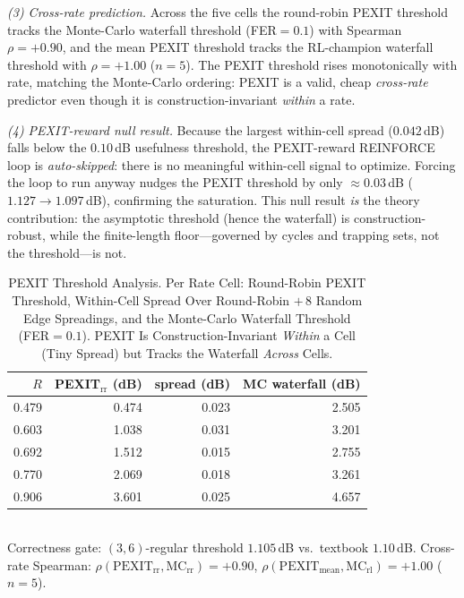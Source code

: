 \documentclass[journal]{IEEEtran}
\begin{document}
\emph{(3) Cross-rate prediction.} Across the five cells the round-robin PEXIT
threshold tracks the Monte-Carlo waterfall threshold (FER$=0.1$) with Spearman
$\rho=+0.90$, and the mean PEXIT threshold tracks the RL-champion waterfall
threshold with $\rho=+1.00$ ($n{=}5$). The PEXIT threshold rises monotonically
with rate, matching the Monte-Carlo ordering: PEXIT is a valid, cheap
\emph{cross-rate} predictor even though it is construction-invariant
\emph{within} a rate.

\emph{(4) PEXIT-reward null result.} Because the largest within-cell spread
($0.042$\,dB) falls below the $0.10$\,dB usefulness threshold, the PEXIT-reward
REINFORCE loop is \emph{auto-skipped}: there is no meaningful within-cell signal
to optimize. Forcing the loop to run anyway nudges the PEXIT threshold by only
$\approx\!0.03$\,dB ($1.127\!\to\!1.097$\,dB), confirming the saturation. This
null result \emph{is} the theory contribution: the asymptotic threshold (hence
the waterfall) is construction-robust, while the finite-length floor---governed
by cycles and trapping sets, not the threshold---is not.

\begin{table}[t]
\centering
\caption{PEXIT Threshold Analysis. Per Rate Cell: Round-Robin PEXIT Threshold,
Within-Cell Spread Over Round-Robin $+\,8$ Random Edge Spreadings, and the
Monte-Carlo Waterfall Threshold (FER$=0.1$). PEXIT Is Construction-Invariant
\emph{Within} a Cell (Tiny Spread) but Tracks the Waterfall \emph{Across} Cells.}
\label{tab:pexit}
\renewcommand{\arraystretch}{1.2}
\setlength{\tabcolsep}{4pt}
\footnotesize
\begin{tabular}{@{}rrrr@{}}
\toprule
$R$ & PEXIT$_{\mathrm{rr}}$ (dB) & spread (dB) & MC waterfall (dB)\\
\midrule
0.479 & 0.474 & 0.023 & 2.505\\
0.603 & 1.038 & 0.031 & 3.201\\
0.692 & 1.512 & 0.015 & 2.755\\
0.770 & 2.069 & 0.018 & 3.261\\
0.906 & 3.601 & 0.025 & 4.657\\
\bottomrule
\end{tabular}
\\[3pt]
{\footnotesize Correctness gate: $(3,6)$-regular threshold $1.105$\,dB vs.\
textbook $1.10$\,dB. Cross-rate Spearman: $\rho(\mathrm{PEXIT}_{\mathrm{rr}},
\mathrm{MC}_{\mathrm{rr}})=+0.90$, $\rho(\mathrm{PEXIT}_{\mathrm{mean}},
\mathrm{MC}_{\mathrm{rl}})=+1.00$ ($n{=}5$).}
\end{table}
\end{document}

